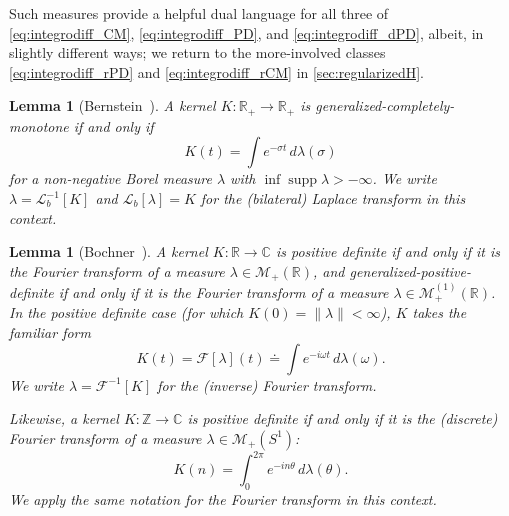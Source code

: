 \documentclass{cams-l} %
\newcommand{\dave}[1]{#1}\newcommand{\davebegin}{}\newcommand{\daveend}{}\newcommand{\george}[1]{#1}
\newcommand{\CC}{\mathbb C}
\newcommand{\RR}{\mathbb R}
\newcommand{\ZZ}{\mathbb Z}
\newcommand{\cL}{\mathcal L}
\newcommand{\cM}{\mathcal M}
\newcommand{\cF}{\mathcal F}
\newcommand{\supp}{\operatorname{supp}}
\newtheorem{lemma}[theorem]{Lemma}
\theoremstyle{definition}
\theoremstyle{remark}
\numberwithin{equation}{section}
\begin{document}
Such measures provide a helpful dual language for all three of \ref{eq:integrodiff_CM}, \ref{eq:integrodiff_PD}, and \ref{eq:integrodiff_dPD}, albeit, in slightly different ways; we return to the more-involved classes \ref{eq:integrodiff_rPD} and \ref{eq:integrodiff_rCM} in \cref{sec:regularizedH}.

\begin{lemma}[Bernstein~\cite{Widder1931NecessaryAS,Gripenberg_Londen_Staffans_1990}]\label{lem:bernstein}
    A kernel \dave{$K:\RR_+\to\RR_+$} is generalized-completely-monotone if and only if
    \[
        K(t) = \int e^{-\sigma t}\,d\lambda(\sigma)
    \]
    for a non-negative Borel measure $\lambda$ with $\inf\supp\lambda >-\infty$. We write $\lambda = \cL_b^{-1}[K]$ and $\cL_b[\lambda]=K$ for the (bilateral) Laplace transform in this context.%
\end{lemma}
\begin{lemma}[Bochner~\cite{reed1975ii}]\label{lem:bochner}
    A kernel $K:\RR\to\CC$ is positive definite if and only if it is the Fourier transform of a measure $\lambda\in\cM_+(\RR)$, and generalized-positive-definite if and only if it is the Fourier transform of a measure $\lambda\in\cM_+^{(1)}(\RR)$. In the positive definite case (for which $K(0)=\|\lambda\|<\infty$), $K$ takes the familiar form
    \[K(t) = \cF[\lambda](t) \doteq \int e^{-i\omega t}\,d\lambda(\omega).\]
    We write $\lambda = \cF^{-1}[K]$ for the (inverse) Fourier transform.

    Likewise, a kernel $K:\ZZ\to\CC$ is positive definite if and only if it is the (discrete) Fourier transform of a measure $\lambda\in\cM_+(S^1)$:
    \[K(n) = \int_0^{2\pi} e^{-in\theta}\,d\lambda(\theta).\]
    We apply the same notation for the Fourier transform in this context.
\end{lemma}
\end{document}
